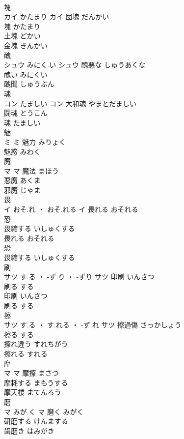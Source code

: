\documentclass[8pt]{extreport}
\begin{document}
\begin{CJK}{UTF8}{min}
\\	塊	
\\	カイ	かたまり	カイ	団塊	だんかい	
\\	塊	かたまり	
\\	土塊	どかい	
\\	金塊	きんかい	
\\	醜	
\\	シュウ	みにく.い	シュウ	醜悪な	しゅうあくな	
\\	醜い	みにくい	
\\	醜聞	しゅうぶん	
\\	魂	
\\	コン	たましい	コン	大和魂	やまとだましい	
\\	闘魂	とうこん	
\\	魂	たましい	
\\	魅	
\\	ミ		ミ	魅力	みりょく	
\\	魅惑	みわく	
\\	魔	
\\	マ		マ	魔法	まほう	
\\	悪魔	あくま	
\\	邪魔	じゃま	
\\	畏	
\\	イ	おそ.れ ・ おそ.れる	イ	畏れる	おそれる	
\\	恐 
\\	畏縮する	いしゅくする	
\\	畏れる	おそれる	
\\	恐 
\\	畏縮する	いしゅくする	
\\	刷	
\\	サツ	す.る ・ -ず.り ・ -ずり	サツ	印刷	いんさつ	
\\	刷る	する	
\\	印刷	いんさつ	
\\	刷る	する	
\\	擦	
\\	サツ	す.る ・ す.れる ・ -ず.れ	サツ	擦過傷	さっかしょう	
\\	擦る	する	
\\	擦れ違う	すれちがう	
\\	擦れる	すれる	
\\	摩	
\\	マ		マ	摩擦	まさつ	
\\	摩耗する	まもうする	
\\	摩天楼	まてんろう	
\\	磨	
\\	マ	みが.く	マ	磨く	みがく	
\\	研磨する	けんまする	
\\	歯磨き	はみがき	
\end{CJK}
\end{document}
